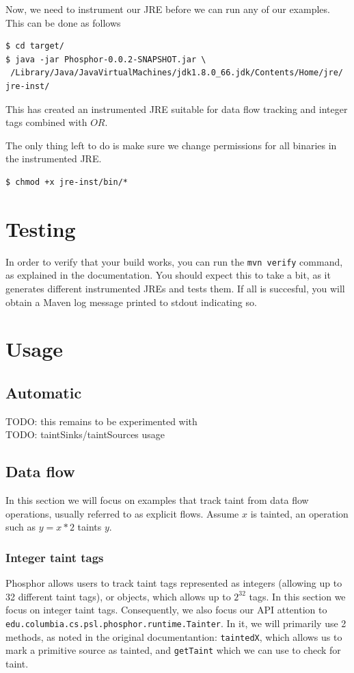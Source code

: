 \documentclass[a4paper]{article}
\newcommand{\todo}[1]{{\color{red}TODO: #1\\}}
\begin{document}
Now, we need to instrument our JRE before we can run any of our examples. This can be done
as follows

\begin{lstlisting}
$ cd target/
$ java -jar Phosphor-0.0.2-SNAPSHOT.jar \
 /Library/Java/JavaVirtualMachines/jdk1.8.0_66.jdk/Contents/Home/jre/ jre-inst/
\end{lstlisting}

This has created an instrumented JRE suitable for data flow tracking and integer
tags combined with $OR$.

The only thing left to do is make sure we change permissions for all binaries in
the instrumented JRE.

\begin{lstlisting}
$ chmod +x jre-inst/bin/*
\end{lstlisting}

\section{Testing}
In order to verify that your build works, you can run the \verb|mvn verify| command, as explained in the documentation.
You should expect this to take a bit, as it generates different instrumented JREs and tests them. If all is succesful,
you will obtain a Maven log message printed to stdout indicating so.

\section{Usage}
\subsection{Automatic}
\todo{this remains to be experimented with}
\todo{taintSinks/taintSources usage}


\subsection{Data flow}
In this section we will focus on examples that track taint from data flow operations, usually referred to as 
explicit flows\cite{denning1976lattice}. Assume $x$ is tainted, an operation such as $y = x * 2$ taints $y$.

\subsubsection{Integer taint tags}
Phosphor allows users to track taint tags represented as integers (allowing up to 32 different taint
tags), or objects, which allows up to $2^{32}$ tags. In this section we focus on integer taint tags.
Consequently, we also focus our API attention to \verb|edu.columbia.cs.psl.phosphor.runtime.Tainter|.
In it, we will primarily use 2 methods, as noted in the
original documentantion: \verb|taintedX|, which allows us to mark a primitive source as tainted, and
\verb|getTaint| which we can use to check for taint.
\end{document}
